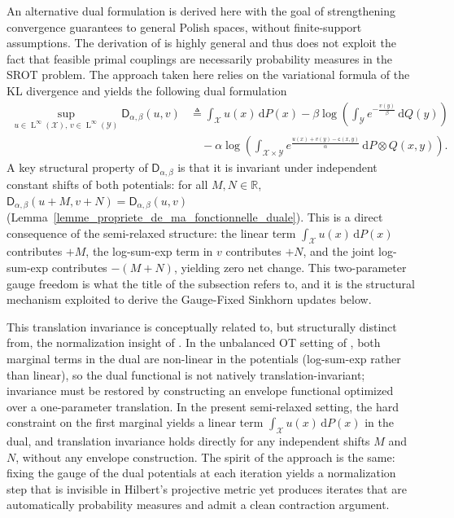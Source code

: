\documentclass{article}
\begin{document}
An alternative dual formulation is derived here with the goal of strengthening convergence
guarantees to general Polish spaces, without finite-support assumptions. The derivation of
\cite{chizat2018scaling} is highly general and thus does not exploit the fact that feasible
primal couplings are necessarily probability measures in the SROT problem. The approach taken here relies on the
variational formula of the KL divergence and yields the following dual formulation
\begin{align}
  \sup_{u\in \operatorname{L}^\infty(\mathcal{X}),\, v \in \operatorname{L}^\infty(\mathcal{Y})}
  \mathsf{D}_{\alpha,\beta}(u,v)
  &\triangleq
  \int_{\mathcal{X}} u(x)\,\mathrm{d}P(x)
  - \beta \log\!\left(\int_{\mathcal{Y}} e^{-\frac{v(y)}{\beta}}\,\mathrm{d}Q(y)\right)
  \nonumber \\
  &\quad
  - \alpha \log\!\left(
    \int_{\mathcal{X} \times \mathcal{Y}}
    e^{\frac{u(x)+v(y)-\mathsf{c}(x,y)}{\alpha}}
    \,\mathrm{d}P\otimes Q(x,y)
  \right). \label{dual_maversion_fonctionnelle_C}
\end{align}
A key structural property of $\mathsf{D}_{\alpha,\beta}$ is that it is invariant under
independent constant shifts of both potentials: for all $M, N \in \mathbb{R}$,
$\mathsf{D}_{\alpha,\beta}(u + M, v + N) = \mathsf{D}_{\alpha,\beta}(u,v)$
(Lemma~\ref{lemme_propriete_de_ma_fonctionnelle_duale}). This is a direct consequence of
the semi-relaxed structure: the linear term $\int_{\mathcal{X}} u(x)\,\mathrm{d}P(x)$
contributes $+M$, the log-sum-exp term in $v$ contributes $+N$, and the joint
log-sum-exp contributes $-(M+N)$, yielding zero net change. This two-parameter gauge
freedom is what the title of the subsection refers to, and it is the structural mechanism
exploited to derive the Gauge-Fixed Sinkhorn updates below.

This translation invariance is conceptually related to, but structurally distinct from,
the normalization insight of \cite{sejourne2022faster}. In the unbalanced OT setting of
\cite{sejourne2022faster}, both marginal terms in the dual are non-linear in the
potentials (log-sum-exp rather than linear), so the dual functional is not natively
translation-invariant; invariance must be restored by constructing an envelope functional
optimized over a one-parameter translation. In the present semi-relaxed setting, the hard
constraint on the first marginal yields a linear term $\int_{\mathcal{X}}
u(x)\,\mathrm{d}P(x)$ in the dual, and translation invariance holds directly for any
independent shifts $M$ and $N$, without any envelope construction. The spirit of the
approach is the same: fixing the gauge of the dual potentials at each iteration yields a
normalization step that is invisible in Hilbert's projective metric yet produces iterates
that are automatically probability measures and admit a clean contraction argument.
\end{document}
